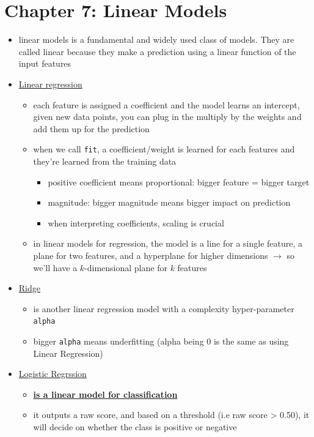 \documentclass[10.5pt,a4paper, fleqn, dvipsnames]{article}
\makeatletter
\newcommand*{\sectionbookmark}[1][]{%
  \bookmark[%
    level=section,%
    dest=\@currentHref,%
    #1%
  ]%
}
\makeatother
\begin{document}
\section*{Chapter 7: Linear Models}
\sectionbookmark{Chapter 7: Linear Models}
\begin{itemize}
    \item linear models is a fundamental and widely used class of models. They are called linear because they make a prediction using a linear function of the input features
    \item \ul{Linear regression}
    \begin{itemize}
        \item each feature is assigned a coefficient and the model learns an intercept, given new data points, you can plug in the multiply by the weights and add them up for the prediction
        \item when we call \lstinline{fit}, a coefficient/weight is learned for each features and they're learned from the training data 
        \begin{itemize}[leftmargin = 2em]
            \item positive coefficient means proportional: bigger feature = bigger target 
            \item magnitude: bigger magnitude means bigger impact on prediction 
            \item when interpreting coefficients, scaling is crucial 
        \end{itemize}
        \item in linear models for regression, the model is a line for a single feature, a plane for two features, and a hyperplane for higher dimensions $\rightarrow$ so we'll have a $k$-dimensional plane for $k$ features
    \end{itemize}
    \item \ul{Ridge}
    \begin{itemize}
        \item is another linear regression model with a complexity hyper-parameter \lstinline{alpha}
        \item bigger \lstinline{alpha} means underfitting (alpha being 0 is the same as using Linear Regression)
    \end{itemize}
    \item \ul{Logistic Regrssion}
    \begin{itemize} 
        \item \ul{\textbf{is a linear model for classification}}
        \item it outputs a raw score, and based on a threshold (i.e raw score > 0.50), it will decide on whether the class is positive or negative 

\end{itemize}
\end{itemize}
\end{document}

